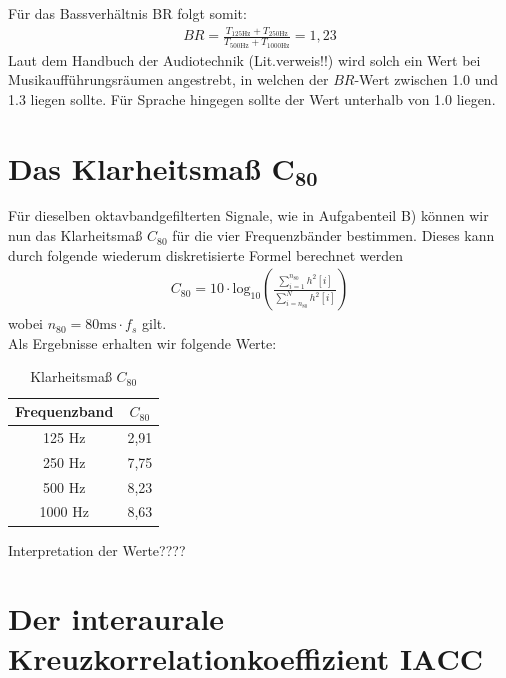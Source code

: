 Für das Bassverhältnis BR folgt somit:
\begin{align*}
BR = \frac{T_{125 \mathrm{Hz}} + T_{250 \mathrm{Hz}}}{T_{500 \mathrm{Hz}} + T_{1000 \mathrm{Hz}}} = 1,23
\end{align*}  
Laut dem Handbuch der Audiotechnik (Lit.verweis!!) wird solch ein Wert bei Musikaufführungsräumen angestrebt, in welchen der $BR$-Wert zwischen 1.0 und 1.3 liegen sollte.
Für Sprache hingegen sollte der Wert unterhalb von 1.0 liegen.

\section{Das Klarheitsmaß $\mathbf{C_{80}}$}
\label{sec:c80}
Für dieselben oktavbandgefilterten Signale, wie in Aufgabenteil B) können wir nun das Klarheitsmaß $C_{80}$ für die vier Frequenzbänder bestimmen.
Dieses kann durch folgende wiederum diskretisierte Formel berechnet werden
\begin{align*}
C_{80} = 10\cdot \mathrm{log}_{10}\left(\frac{ \sum_{i=1}^{n_{80}} h^2[i]}{\sum_{i=n_{80}}^N h^2[i]}\right)
\end{align*}
wobei $n_{80} = 80 \mathrm{ms} \cdot f_s$ gilt. \\
Als Ergebnisse erhalten wir folgende Werte:
\begin{table}[H]
\centering
\caption{Klarheitsmaß $C_{80}$}
\label{tab:C80}
\begin{tabular}{| c | c |}
\hline
  Frequenzband & $C_{80}$ \\
  \hline
  125 Hz & 2,91 \\
  250 Hz & 7,75 \\
  500 Hz & 8,23 \\
  1000 Hz & 8,63  \\
  \hline
  \end{tabular}
\end{table}

Interpretation der Werte????

\section{Der interaurale Kreuzkorrelationkoeffizient $\mathbf{IACC}$}
\label{sec:iacc}

